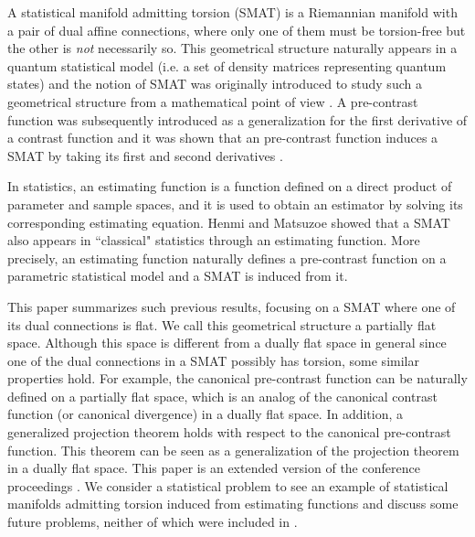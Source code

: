 \documentclass[graybox]{svmult}
\begin{document}
A statistical manifold admitting torsion (SMAT) is a Riemannian manifold with a pair of
dual affine connections, where only one of them must be torsion-free but the other
is {\it not} necessarily so. This geometrical structure naturally appears in a quantum
statistical model (i.e. a set of density matrices representing quantum states) \cite{AN}
and the notion of SMAT was originally introduced to study such a geometrical structure
from a mathematical point of view \cite{Ku2}. A pre-contrast function was subsequently
introduced as a generalization for the first derivative of a contrast function and it was
shown that an pre-contrast function induces a SMAT by taking its first and second
derivatives \cite{Ma2}.

In statistics, an estimating function is a function defined on a direct product of
parameter and sample spaces, and it is used to obtain an estimator by solving its 
corresponding estimating equation.
Henmi and Matsuzoe \cite{HM} showed that a SMAT also appears in ``classical"
statistics through an estimating function. More precisely, an estimating function
naturally defines a pre-contrast function on a parametric statistical model and a
SMAT is induced from it.

This paper summarizes such previous results, focusing on a SMAT where one
of its dual connections is flat. We call this geometrical structure a partially flat space.
Although this space is different from a dually flat space in general since one of the
dual connections in a SMAT possibly has torsion, some similar properties hold.
For example, the canonical pre-contrast function can be naturally defined on a
partially flat space, which is an analog of the canonical contrast function (or canonical
divergence) in a dually flat space. In addition, a generalized projection theorem holds
with respect to the canonical pre-contrast function. This theorem can be seen as a
generalization of the projection theorem in a dually flat space.
This paper is an extended version of the conference proceedings \cite{He}.
We consider a statistical problem to see an example of statistical manifolds admitting
torsion induced from estimating functions and discuss some future problems, neither of
which were included in \cite{He}.

\end{document}

